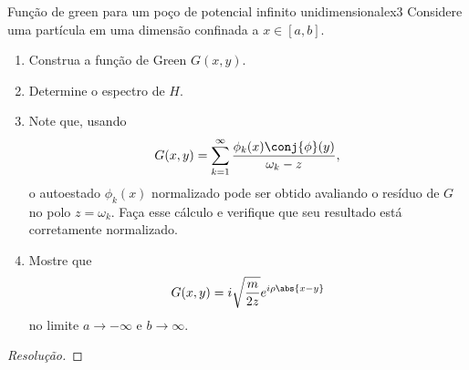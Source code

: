 \begin{exercício}{Função de green para um poço de potencial infinito unidimensional}{ex3}
   Considere uma partícula em uma dimensão confinada a \(x \in [a,b].\)
   \begin{enumerate}[label=(\alph*)]
       \item Construa a função de Green \(G(x,y)\).
       \item Determine o espectro de \(H\).
       \item Note que, usando
          \begin{equation*}
             G(x,y) = \sum_{k = 1}^\infty \frac{\phi_k(x) \conj{\phi}(y)}{\omega_k - z},
          \end{equation*}
          o autoestado \(\phi_k(x)\) normalizado pode ser obtido avaliando o resíduo de \(G\) no polo \(z = \omega_k\). Faça esse cálculo e verifique que seu resultado está corretamente normalizado.
       \item Mostre que
          \begin{equation*}
             G(x,y) = i \sqrt{\frac{m}{2z}} e^{i \rho \abs{x - y}}
          \end{equation*}
          no limite \(a \to -\infty\) e \(b \to \infty\).
   \end{enumerate}
\end{exercício}
\begin{proof}[Resolução]
    
\end{proof}

